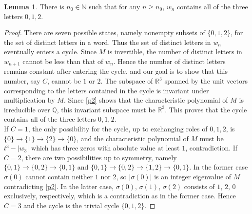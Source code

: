 \documentclass{article}
\theoremstyle{definition}
\newtheorem{lemma}[theorem]{Lemma}
\begin{document}
\begin{lemma}
\label{l3}
There is $n_0\in\mathbb{N}$ such that for any $n\geq n_0$, $w_n$ contains all of the three letters $0,1,2$.
\end{lemma}
\begin{proof}
There are seven possible states, namely nonempty subsets of $\{0,1,2\}$, for the set of distinct letters in a word. Thus the set of distinct letters in $w_n$ eventually enters a cycle. Since $M$ is invertible, the number of distinct letters in $w_{n+1}$ cannot be less than that of $w_n$. Hence the number of distinct letters remains constant after entering the cycle, and our goal is to show that this number, say $C$, cannot be $1$ or $2$. The subspace of $\mathbb{R}^3$ spanned by the unit vectors corresponding to the letters contained in the cycle is invariant under multiplication by $M$. Since \cref{p2} shows that the characteristic polynomial of $M$ is irreducible over $\mathbb{Q}$, this invariant subspace must be $\mathbb{R}^3$. This proves that the cycle contains all of the three letters $0,1,2$.\\
If $C=1$, the only possibility for the cycle, up to exchanging roles of $0, 1, 2$, is $\{0\}\rightarrow \{1\}\rightarrow \{2\}\rightarrow\{0\}$, and the characteristic polynomial of $M$ must be $t^3-|w_3|$ which has three zeros with absolute value at least $1$, contradiction. If $C=2$, there are two possibilities up to symmetry, namely $\{0, 1\}\rightarrow\{0,2\}\rightarrow\{0,1\}$ and $\{0, 1\}\rightarrow\{0,2\}\rightarrow\{1,2\}\rightarrow\{0,1\}$. In the former case $\sigma(0)$ cannot contain neither $1$ nor $2$, so $|\sigma(0)|$ is an integer eigenvalue of $M$ contradicting \cref{p2}. In the latter case, $\sigma(0)$, $\sigma(1)$, $\sigma(2)$ consists of $1$, $2$, $0$ exclusively, respectively, which is a contradiction as in the former case. Hence $C=3$ and the cycle is the trivial cycle $\{0,1,2\}$.
\end{proof}
\end{document}
